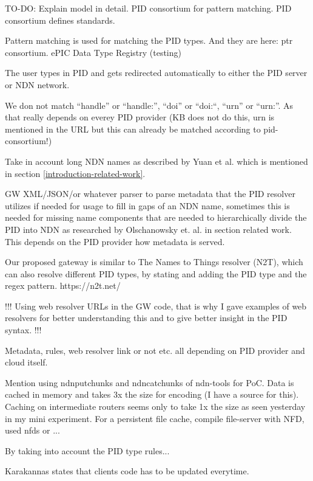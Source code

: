 TO-DO:
\newline
Explain model in detail.
PID consortium for pattern matching. PID consortium defines standards.

Pattern matching is used for matching the PID types. And they are here: ptr consortium.
ePIC Data Type Registry (testing)

The user types in PID and gets redirected automatically to either the PID server or NDN network.

We don not match “handle” or “handle:”, “doi” or “doi:“, “urn” or “urn:”. As that really depends on everey PID provider (KB does not do this, urn is mentioned in the URL but this can already be matched according to pid-consortium!) 

Take in account long NDN names as described by Yuan et al. \cite{yuan2012scalable} which is mentioned in section \ref{introduction-related-work}.

GW XML/JSON/or whatever parser to parse metadata that the PID resolver utilizes if needed for usage to fill in gaps of an NDN name, sometimes this is needed for missing name components that are needed to hierarchically divide the PID into NDN as researched by Olschanowsky et. al. in section related work. 
This depends on the PID provider how metadata is served.

Our proposed gateway is similar to The Names to Things resolver (N2T), which can also resolve different PID types, by stating and adding the PID type and the regex pattern. https://n2t.net/

!!! Using web resolver URLs in the GW code, that is why I gave examples of web resolvers for better understanding this and to give better insight in the PID syntax. !!!

Metadata, rules, web resolver link or not etc. all depending on PID provider and cloud itself.

Mention using ndnputchunks and ndncatchunks of ndn-tools for PoC. Data is cached in memory and takes 3x the size for encoding (I have a source for this). Caching on intermediate routers seems only to take 1x the size as seen yesterday in my mini experiment. For a persistent file cache, compile file-server with NFD, used nfds or ...

By taking into account the PID type rules...

Karakannas states that clients code has to be updated everytime.